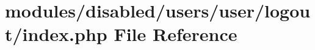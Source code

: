 \hypertarget{disabled_2users_2user_2logout_2index_8php}{\section{modules/disabled/users/user/logout/index.php File Reference}
\label{disabled_2users_2user_2logout_2index_8php}
}
